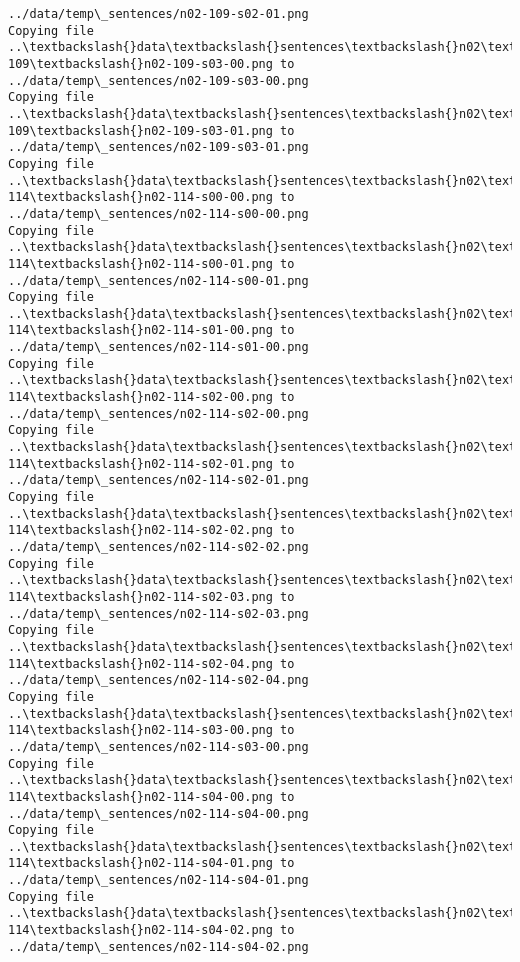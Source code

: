 \documentclass[11pt]{article}
\begin{document}
\begin{Verbatim}[commandchars=\\\{\}]
../data/temp\_sentences/n02-109-s02-01.png
Copying file ..\textbackslash{}data\textbackslash{}sentences\textbackslash{}n02\textbackslash{}n02-109\textbackslash{}n02-109-s03-00.png to
../data/temp\_sentences/n02-109-s03-00.png
Copying file ..\textbackslash{}data\textbackslash{}sentences\textbackslash{}n02\textbackslash{}n02-109\textbackslash{}n02-109-s03-01.png to
../data/temp\_sentences/n02-109-s03-01.png
Copying file ..\textbackslash{}data\textbackslash{}sentences\textbackslash{}n02\textbackslash{}n02-114\textbackslash{}n02-114-s00-00.png to
../data/temp\_sentences/n02-114-s00-00.png
Copying file ..\textbackslash{}data\textbackslash{}sentences\textbackslash{}n02\textbackslash{}n02-114\textbackslash{}n02-114-s00-01.png to
../data/temp\_sentences/n02-114-s00-01.png
Copying file ..\textbackslash{}data\textbackslash{}sentences\textbackslash{}n02\textbackslash{}n02-114\textbackslash{}n02-114-s01-00.png to
../data/temp\_sentences/n02-114-s01-00.png
Copying file ..\textbackslash{}data\textbackslash{}sentences\textbackslash{}n02\textbackslash{}n02-114\textbackslash{}n02-114-s02-00.png to
../data/temp\_sentences/n02-114-s02-00.png
Copying file ..\textbackslash{}data\textbackslash{}sentences\textbackslash{}n02\textbackslash{}n02-114\textbackslash{}n02-114-s02-01.png to
../data/temp\_sentences/n02-114-s02-01.png
Copying file ..\textbackslash{}data\textbackslash{}sentences\textbackslash{}n02\textbackslash{}n02-114\textbackslash{}n02-114-s02-02.png to
../data/temp\_sentences/n02-114-s02-02.png
Copying file ..\textbackslash{}data\textbackslash{}sentences\textbackslash{}n02\textbackslash{}n02-114\textbackslash{}n02-114-s02-03.png to
../data/temp\_sentences/n02-114-s02-03.png
Copying file ..\textbackslash{}data\textbackslash{}sentences\textbackslash{}n02\textbackslash{}n02-114\textbackslash{}n02-114-s02-04.png to
../data/temp\_sentences/n02-114-s02-04.png
Copying file ..\textbackslash{}data\textbackslash{}sentences\textbackslash{}n02\textbackslash{}n02-114\textbackslash{}n02-114-s03-00.png to
../data/temp\_sentences/n02-114-s03-00.png
Copying file ..\textbackslash{}data\textbackslash{}sentences\textbackslash{}n02\textbackslash{}n02-114\textbackslash{}n02-114-s04-00.png to
../data/temp\_sentences/n02-114-s04-00.png
Copying file ..\textbackslash{}data\textbackslash{}sentences\textbackslash{}n02\textbackslash{}n02-114\textbackslash{}n02-114-s04-01.png to
../data/temp\_sentences/n02-114-s04-01.png
Copying file ..\textbackslash{}data\textbackslash{}sentences\textbackslash{}n02\textbackslash{}n02-114\textbackslash{}n02-114-s04-02.png to
../data/temp\_sentences/n02-114-s04-02.png

\end{Verbatim}
\end{document}
